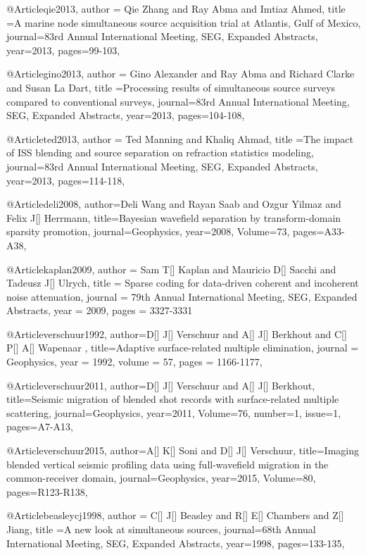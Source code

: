 @Article{qie2013,
  author = {Qie Zhang and Ray Abma and Imtiaz Ahmed},
  title ={A marine node simultaneous source acquisition trial at Atlantis, Gulf of Mexico},
  journal={83rd Annual International Meeting, SEG, Expanded Abstracts},
  year=2013,
  pages={99-103},
}

@Article{gino2013,
  author = {Gino Alexander and Ray Abma and Richard Clarke and Susan La Dart},
  title ={Processing results of simultaneous source surveys compared to conventional surveys},
  journal={83rd Annual International Meeting, SEG, Expanded Abstracts},
  year=2013,
  pages={104-108},
}

@Article{ted2013,
  author = {Ted Manning and Khaliq Ahmad},
  title ={The impact of ISS blending and source separation on refraction statistics modeling},
  journal={83rd Annual International Meeting, SEG, Expanded Abstracts},
  year=2013,
  pages={114-118},
}

@Article{deli2008,
  author={Deli Wang and Rayan Saab and Ozgur Yilmaz and Felix J[] Herrmann},
  title={Bayesian wavefield separation by transform-domain sparsity promotion},
  journal={Geophysics},
  year=2008,
  Volume=73,
  pages={A33-A38},
}


@Article{kaplan2009,
  author = 	 {Sam T[] Kaplan and Mauricio D[] Sacchi and Tadeusz J[] Ulrych},
  title = 	 {Sparse coding for data-driven coherent and incoherent noise attenuation},
  journal = 	 {79th Annual International Meeting, SEG, Expanded Abstracts},
  year = 	 2009,
  pages =	 {3327-3331}
}



@Article{verschuur1992,
  author={D[] J[] Verschuur and A[] J[] Berkhout and C[] P[] A[] Wapenaar },
  title={Adaptive surface-related multiple elimination},
  journal = 	 {Geophysics},
  year = 	 1992,
  volume =	 57,
  pages =	 {1166-1177},
}

@Article{verschuur2011,
  author={D[] J[] Verschuur and A[] J[] Berkhout},
  title={Seismic migration of blended shot records with surface-related multiple scattering},
  journal={Geophysics},
  year=2011,
  Volume=76,
  number=1,
  issue=1,
  pages={A7-A13},
}

@Article{verschuur2015,
  author={A[] K[] Soni and D[] J[] Verschuur},
  title={Imaging blended vertical seismic profiling data using full-wavefield migration in the common-receiver domain},
  journal={Geophysics},
  year=2015,
  Volume=80,
  pages={R123-R138},
}


@Article{beasleycj1998,
  author = {C[] J[] Beasley and R[] E[] Chambers and Z[] Jiang},
  title ={A new look at simultaneous sources},
  journal={68th Annual International Meeting, SEG, Expanded Abstracts},
  year=1998,
  pages={133-135},
}

